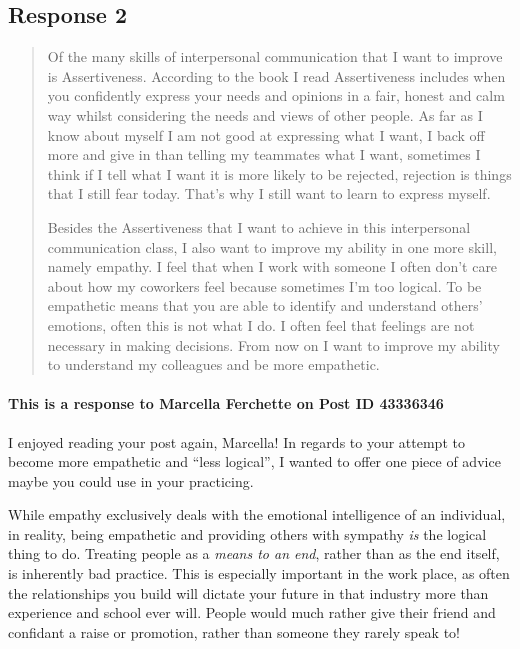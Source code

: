 
\subsection{Response 2}
  \begin{quotation}
    Of the many skills of interpersonal communication that I want to improve is
      Assertiveness. According to the book I read Assertiveness includes when
      you confidently express your needs and opinions in a fair, honest and
      calm way whilst considering the needs and views of other people. As far
      as I know about myself I am not good at expressing what I want, I back
      off more and give in than telling my teammates what I want, sometimes I
      think if I tell what I want it is more likely to be rejected, rejection
      is things that I still fear today. That's why I still want to learn to
      express myself.

    Besides the Assertiveness that I want to achieve in this interpersonal
      communication class, I also want to improve my ability in one more skill,
      namely empathy. I feel that when I work with someone I often don't care
      about how my coworkers feel because sometimes I'm too logical. To be
      empathetic means that you are able to identify and understand others'
      emotions, often this is not what I do. I often feel that feelings are not
      necessary in making decisions. From now on I want to improve my ability to
      understand my colleagues and be more empathetic.
  \end{quotation}

  \paragraph{This is a response to Marcella Ferchette on Post ID 43336346}
    I enjoyed reading your post again, Marcella! In regards to your attempt to
      become more empathetic and ``less logical'', I wanted to offer one piece
      of advice maybe you could use in your practicing.

    While empathy exclusively deals with the emotional intelligence of an
      individual, in reality, being empathetic and providing others with
      sympathy \textit{is} the logical thing to do. Treating people as a
      \textit{means to an end}, rather than as the end itself, is inherently
      bad practice. This is especially important in the work place, as often
      the relationships you build will dictate your future in that industry
      more than experience and school ever will. People would much rather
      give their friend and confidant a raise or promotion, rather than someone
      they rarely speak to!
